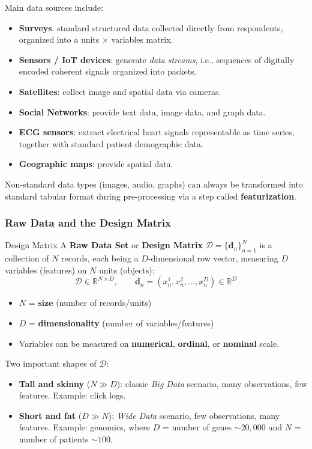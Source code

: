 \documentclass[11pt]{article}
\theoremstyle{smallexample}
\newcommand{\vs}{\vspace{0.2\baselineskip}}
\begin{document}
Main data sources include:
\begin{itemize}
    \item \textbf{Surveys}: standard structured data collected directly from respondents,
    organized into a units $\times$ variables matrix.
    \item \textbf{Sensors / IoT devices}: generate \textit{data streams}, i.e., sequences
    of digitally encoded coherent signals organized into packets.
    \item \textbf{Satellites}: collect image and spatial data via cameras.
    \item \textbf{Social Networks}: provide text data, image data, and graph data.
    \item \textbf{ECG sensors}: extract electrical heart signals representable as
    time series, together with standard patient demographic data.
    \item \textbf{Geographic maps}: provide spatial data.
\end{itemize}

\vs
Non-standard data types (images, audio, graphs) can always be transformed into
standard tabular format during pre-processing via a step called \textbf{featurization}.

\subsubsection{Raw Data and the Design Matrix}

\begin{defbox}{Design Matrix}
    A \textbf{Raw Data Set} or \textbf{Design Matrix} $\mathcal{D} = \{\mathbf{d}_n\}_{n=1}^{N}$
    is a collection of $N$ records, each being a $D$-dimensional row vector, measuring
    $D$ variables (features) on $N$ units (objects):
    \[
        \mathcal{D} \in \mathbb{R}^{N \times D}, \qquad
        \mathbf{d}_n = (x_n^1, x_n^2, \ldots, x_n^D) \in \mathbb{R}^D
    \]
    \begin{itemize}
        \item $N$ = \textbf{size} (number of records/units)
        \item $D$ = \textbf{dimensionality} (number of variables/features)
        \item Variables can be measured on \textbf{numerical}, \textbf{ordinal}, or
        \textbf{nominal} scale.
    \end{itemize}
\end{defbox}

Two important shapes of $\mathcal{D}$:
\begin{itemize}
    \item \textbf{Tall and skinny} ($N \gg D$): classic \textit{Big Data} scenario, many
    observations, few features. Example: click logs.
    \item \textbf{Short and fat} ($D \gg N$): \textit{Wide Data} scenario, few observations,
    many features. Example: genomics, where $D$ = number of genes $\sim 20{,}000$
    and $N$ = number of patients $\sim 100$.
\end{itemize}
\end{document}
